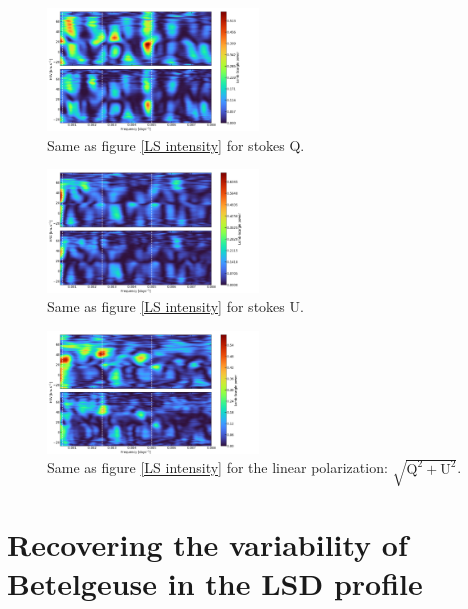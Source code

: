 \documentclass{aa}
\begin{document}
\begin{figure}[!h]
    \centering
    \includegraphics[width=0.5\textwidth]{Lomb-Scargle Stokes Q.png}
    \caption{Same as figure \ref{LS intensity} for stokes Q. }
    \label{LS Q}
\end{figure}

\begin{figure}[!h]
    \centering
    \includegraphics[width=0.5\textwidth]{Lomb-Scargle Stokes U.png}
    \caption{Same as figure \ref{LS intensity} for stokes U.}
    \label{LS U}
\end{figure}


\begin{figure}[!h]
    \centering
    \includegraphics[width=0.5\textwidth]{Lomb-Scargle linear polarization.png}
    \caption{Same as figure \ref{LS intensity} for the linear polarization: $\sqrt{\mathrm{Q^2}+\mathrm{U^2}}$.}
    \label{LS linear polarization}
\end{figure}



\section{Recovering the variability of Betelgeuse in the LSD profile}
\end{document}
